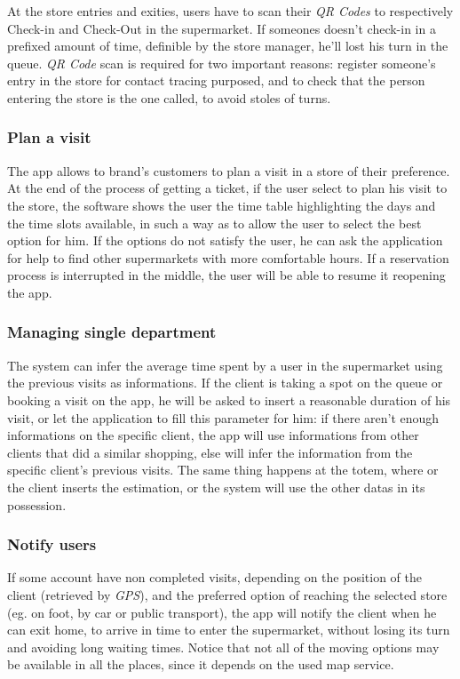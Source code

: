 \documentclass{article}
\begin{document}
		At the store entries and exities, users have to scan their \emph{QR Codes} to respectively Check-in and Check-Out in the supermarket. If someones doesn't check-in in a prefixed amount of time, definible by the store manager, he'll lost his turn in the queue. \emph{QR Code} scan is required for two important reasons: register someone's entry in the store for contact tracing purposed, and to check that the person entering the store is the one called, to avoid stoles of turns.
		
		\subsubsection{Plan a visit}
		
		The app allows to brand's customers to plan a visit in a store of their preference. At the end of the process of getting a ticket, if the user select to plan his visit to the store, the software shows the user the time table highlighting the days and the time slots available, in such a way as to allow the user to select the best option for him. If the options do not satisfy the user, he can ask the application for help to find other supermarkets with more comfortable hours. If a reservation process is interrupted in the middle, the user will be able to resume it reopening the app.
		
		\subsubsection{Managing single department}
		
		The system can infer the average time spent by a user in the supermarket using the previous visits as informations. If the client is taking a spot on the queue or booking a visit on the app, he will be asked to insert a reasonable duration of his visit, or let the application to fill this parameter for him: if there aren't enough informations on the specific client, the app will use informations from other clients that did a similar shopping, else will infer the information from the specific client's previous visits. The same thing happens at the totem, where or the client inserts the estimation, or the system will use the other datas in its possession.
		
		\subsubsection{Notify users}
		
		If some account have non completed visits, depending on the position of the client (retrieved by \emph{GPS}), and the preferred option of reaching the selected store (eg. on foot, by car or public transport), the app will notify the client when he can exit home, to arrive in time to enter the supermarket, without losing its turn and avoiding long waiting times. Notice that not all of the moving options may be available in all the places, since it depends on the used map service.
		
\end{document}
